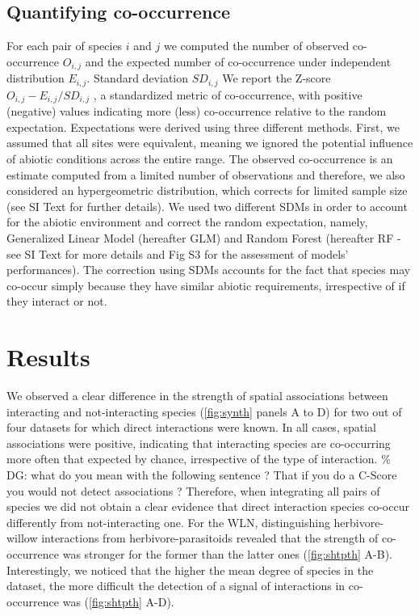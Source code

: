 \subsection{Quantifying co-occurrence}\label{quantifying-co-occurrence}

For each pair of species \(i\) and \(j\) we computed the number of
observed co-occurrence \(O_{i,j}\) and the expected number of
co-occurrence under independent distribution \(E_{i,j}\). Standard
deviation \(SD_{i,j}\) We report the Z-score
\(O_{i,j}-E_{i,j}/SD_{i,j}\) \citep{Gilpin1982}, a standardized metric
of co-occurrence, with positive (negative) values indicating more (less)
co-occurrence relative to the random expectation. Expectations were
derived using three different methods. First, we assumed that all sites
were equivalent, meaning we ignored the potential influence of abiotic
conditions across the entire range. The observed co-occurrence is an
estimate computed from a limited number of observations
\citep{Gilpin1982, Veech2013} and therefore, we also considered an
hypergeometric distribution, which corrects for limited sample size (see
SI Text for further details). We used two different SDMs in order to
account for the abiotic environment and correct the random expectation,
namely, Generalized Linear Model (hereafter GLM) and Random Forest
(hereafter RF - see SI Text for more details and Fig S3 for the
assessment of models' performances). The correction using SDMs accounts
for the fact that species may co-occur simply because they have similar
abiotic requirements, irrespective of if they interact or not.

\section{Results}\label{results}

We observed a clear difference in the strength of spatial associations
between interacting and not-interacting species (\ref{fig:synth} panels
A to D) for two out of four datasets for which direct interactions were
known. In all cases, spatial associations were positive, indicating that
interacting species are co-occurring more often that expected by chance,
irrespective of the type of interaction. \% DG: what do you mean with
the following sentence ? That if you do a C-Score you would not detect
associations ? Therefore, when integrating all pairs of species we did
not obtain a clear evidence that direct interaction species co-occur
differently from not-interacting one. For the WLN, distinguishing
herbivore-willow interactions from herbivore-parasitoids revealed that
the strength of co-occurrence was stronger for the former than the
latter ones (\ref{fig:shtpth} A-B). Interestingly, we noticed that the
higher the mean degree of species in the dataset, the more difficult the
detection of a signal of interactions in co-occurrence was
(\ref{fig:shtpth} A-D).

